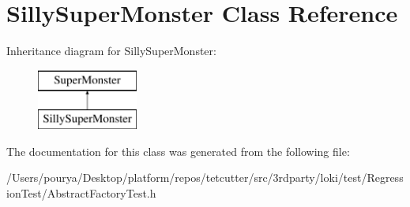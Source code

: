 \hypertarget{classSillySuperMonster}{}\section{Silly\+Super\+Monster Class Reference}
\label{classSillySuperMonster}
Inheritance diagram for Silly\+Super\+Monster\+:\begin{figure}[H]
\begin{center}
\leavevmode
\includegraphics[height=2.000000cm]{classSillySuperMonster}
\end{center}
\end{figure}


The documentation for this class was generated from the following file\+:\begin{DoxyCompactItemize}
\item 
/\+Users/pourya/\+Desktop/platform/repos/tetcutter/src/3rdparty/loki/test/\+Regression\+Test/Abstract\+Factory\+Test.\+h\end{DoxyCompactItemize}

